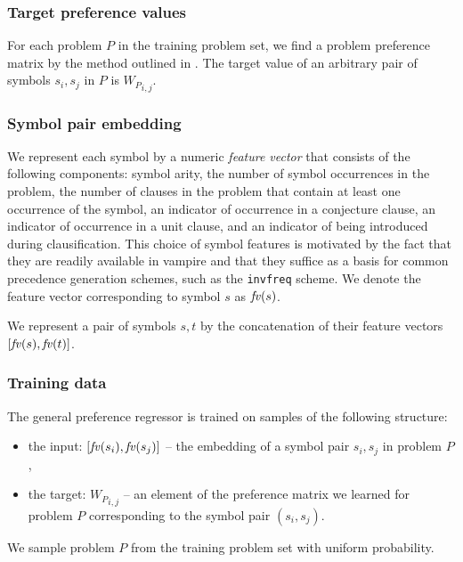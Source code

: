 \documentclass{ceurart}
\begin{document}
\subsubsection{Target preference values}
\label{sec:target-preference-values}

For each problem \(P\) in the training problem set,
we find a problem preference matrix by the method outlined in .
The target value of an arbitrary pair of symbols \(s_i, s_j\) in \(P\) is \({W_P}_{i,j}\).

\subsubsection{Symbol pair embedding} \label{sect:embeddings}

We represent each symbol by a numeric \emph{feature vector} that consists of the following components:
symbol arity, %
the number of symbol occurrences in the problem, %
the number of clauses in the problem that contain at least one occurrence of the symbol, %
an indicator of occurrence in a conjecture clause, %
an indicator of occurrence in a unit clause, %
and an indicator of being introduced during clausification. %
This choice of symbol features is motivated by the fact that they
are readily available in %
\gls*{vampire}
and that they suffice as a basis for common precedence generation schemes,
such as the \texttt{invfreq} scheme.
We denote the feature vector corresponding to symbol \(s\) as \(\mathit{fv}(s)\).

We represent a pair of symbols \(s, t\)
by the concatenation of their feature vectors \([\mathit{fv}(s), \mathit{fv}(t)]\).

\subsubsection{Training data}

The general preference regressor is trained on samples of the following structure:

\begin{itemize}
	\item the input: \([\mathit{fv}(s_i), \mathit{fv}(s_j)]\) -- the embedding of a symbol pair \(s_i, s_j\) in problem \(P\),
	\item the target: \({W_P}_{i,j}\) -- an element of the preference matrix we learned for problem \(P\)
	corresponding to the symbol pair \((s_i,s_j)\).
\end{itemize}
We sample problem \(P\) from the training problem set with uniform probability.
\end{document}
